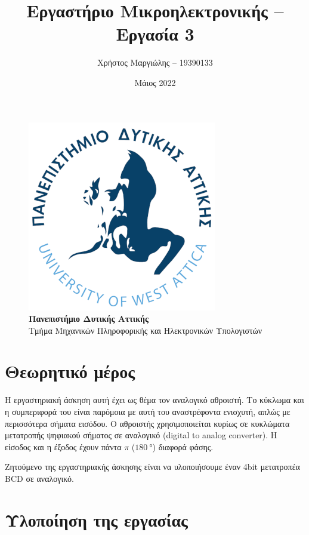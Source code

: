 \documentclass[12pt]{article}
\title{Εργαστήριο Μικροηλεκτρονικής -- Εργασία 3}
\author{Χρήστος Μαργιώλης -- 19390133}
\date{Μάιος 2022}
\begin{document}
\begin{titlepage}
        \maketitle
        \begin{figure}[t!]
        \begin{center}
        \includegraphics[scale=0.3]{./res/uniwalogo.png} \\
        \Large
        \textbf{Πανεπιστήμιο Δυτικής Αττικής} \\
        \large
        Τμήμα Μηχανικών Πληροφορικής και Ηλεκτρονικών Υπολογιστών
        \end{center}
        \end{figure}
\end{titlepage}

\renewcommand{\contentsname}{Περιεχόμενα}
\tableofcontents
\pagebreak

\section{Θεωρητικό μέρος}

Η εργαστηριακή άσκηση αυτή έχει ως θέμα τον αναλογικό αθροιστή. Το κύκλωμα και
η συμπεριφορά του είναι παρόμοια με αυτή του αναστρέφοντα ενισχυτή, απλώς με
περισσότερα σήματα εισόδου. Ο αθροιστής χρησιμοποιείται κυρίως σε κυκλώματα
μετατροπής ψηφιακού σήματος σε αναλογικό (digital to analog converter). Η
είσοδος και η έξοδος έχουν πάντα $\pi$ ($\SI{180}{\degree}$) διαφορά φάσης.

Ζητούμενο της εργαστηριακής άσκησης είναι να υλοποιήσουμε έναν 4bit μετατροπέα
BCD σε αναλογικό.

\section{Υλοποίηση της εργασίας}
\end{document}
